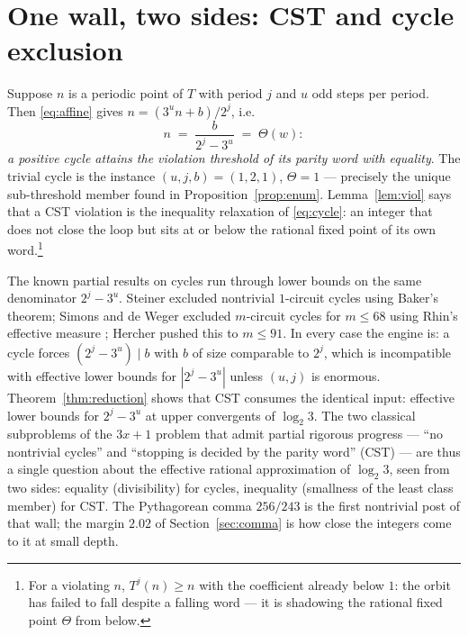 \documentclass[10pt]{article}
\theoremstyle{definition}
\theoremstyle{remark}
\newcommand{\lb}{\log_2 3}
\begin{document}
\section{One wall, two sides: CST and cycle exclusion}\label{sec:onewall}

Suppose $n$ is a periodic point of $T$ with period $j$ and $u$ odd steps per
period. Then \eqref{eq:affine} gives $n = (3^{u} n + b)/2^{j}$, i.e.
\begin{equation}\label{eq:cycle}
n \;=\; \frac{b}{2^{j} - 3^{u}} \;=\; \Theta(w):
\end{equation}
\emph{a positive cycle attains the violation threshold of its parity word
with equality}. The trivial cycle is the instance $(u,j,b) = (1,2,1)$,
$\Theta = 1$ --- precisely the unique sub-threshold member found in
Proposition~\ref{prop:enum}. Lemma~\ref{lem:viol} says that a CST violation
is the inequality relaxation of \eqref{eq:cycle}: an integer that does not
close the loop but sits at or below the rational fixed point of its own
word.\footnote{For a violating $n$, $T^{j}(n) \ge n$ with the coefficient
already below $1$: the orbit has failed to fall despite a falling word ---
it is shadowing the rational fixed point $\Theta$ from below.}

The known partial results on cycles run through lower bounds on the same
denominator $2^{j} - 3^{u}$. Steiner \cite{Steiner1977} excluded nontrivial
$1$-circuit cycles using Baker's theorem; Simons and de Weger
\cite{SimonsDeWeger2005} excluded $m$-circuit cycles for $m \le 68$ using
Rhin's effective measure \cite{Rhin1987}; Hercher \cite{Hercher2023} pushed
this to $m \le 91$. In every case the engine is: a cycle forces
$(2^{j}-3^{u}) \mid b$ with $b$ of size comparable to $2^{j}$, which is
incompatible with effective lower bounds for $|2^{j}-3^{u}|$ unless
$(u,j)$ is enormous. Theorem~\ref{thm:reduction} shows that CST consumes the
identical input: effective lower bounds for $2^{j} - 3^{u}$ at upper
convergents of $\lb$. The two classical subproblems of the $3x+1$ problem
that admit partial rigorous progress --- ``no nontrivial cycles'' and
``stopping is decided by the parity word'' (CST) --- are thus a single
question about the effective rational approximation of $\lb$, seen from two
sides: equality (divisibility) for cycles, inequality (smallness of the
least class member) for CST. The Pythagorean comma $256/243$ is the first
nontrivial post of that wall; the margin $2.02$ of Section~\ref{sec:comma}
is how close the integers come to it at small depth.
\end{document}
